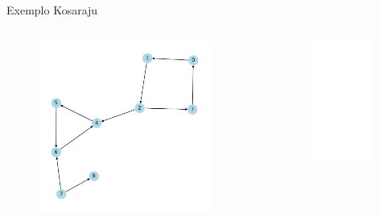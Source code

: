 \documentclass[aspectratio=169,usenames,dvipsnames]{beamer}
\begin{document}
\begin{frame}{Exemplo Kosaraju}

  \begin{columns}
  \begin{figure}[ht]
  \centering
  \includegraphics[width=0.9\textwidth]{figs/strongly_components_3.pdf}
  \end{figure}
  \begin{figure}[ht]
  \centering
  \includegraphics<2>[width=0.9\textwidth]{figs/strongly_components_4.pdf}
  \end{figure}
  \end{columns}

\end{frame}
\end{document}
